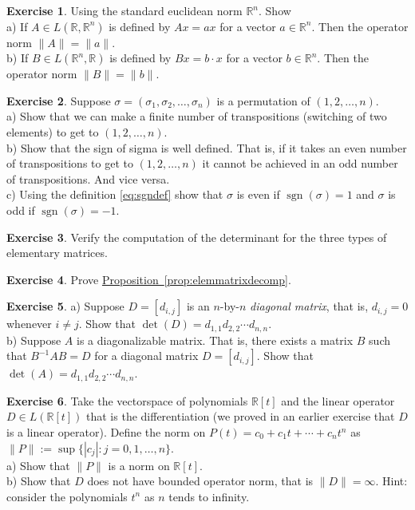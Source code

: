 \documentclass[12pt]{book}
\newcommand{\snorm}[1]{\lVert {#1} \rVert}
\newcommand{\abs}[1]{\left\lvert {#1} \right\rvert}
\newcommand{\R}{{\mathbb{R}}}
\newcommand{\myindex}[1]{#1\index{#1}}
\theoremstyle{plain}
\theoremstyle{remark}
\theoremstyle{definition}
\theoremstyle{exercise}
\newtheorem{exercise}{Exercise}[section]
\theoremstyle{example}
\newcommand{\propref}[1]{\hyperref[#1]{Proposition~\ref*{#1}}}
\begin{document}
\begin{exercise} \label{exercise:normonedim}
Using the standard euclidean norm $\R^n$. Show
\\
a) If $A \in L(\R,\R^n)$ is defined by $Ax = ax$
for a vector $a \in \R^n$.
Then the operator norm $\snorm{A} = \snorm{a}$.
\\
b) If $B \in L(\R^n,\R)$ is defined by $Bx = b \cdot x$
for a vector $b \in \R^n$.
Then the operator norm $\snorm{B} = \snorm{b}$.
\end{exercise}

\begin{exercise}
Suppose $\sigma = (\sigma_1,\sigma_2,\ldots,\sigma_n)$ is a permutation of
$(1,2,\ldots,n)$.\\
a) Show that we can make a finite number of transpositions (switching of two
elements) to get to $(1,2,\ldots,n)$.\\
b) Show that the sign of sigma is well defined.  That is, if it takes an even number
of transpositions to get to $(1,2,\ldots,n)$ it cannot be achieved in an odd
number of transpositions.  And vice versa.\\
c) Using the definition \eqref{eq:sgndef}
show that $\sigma$ is even if $\operatorname{sgn}(\sigma) = 1$ and $\sigma$
is odd if $\operatorname{sgn}(\sigma) = -1$.
\end{exercise}

\begin{exercise}
Verify the computation of the determinant for the three types of 
elementary matrices.
\end{exercise}

\begin{exercise}
Prove \propref{prop:elemmatrixdecomp}.
\end{exercise}

\begin{exercise}
a) Suppose $D = [d_{i,j}]$ is an $n$-by-$n$ \emph{\myindex{diagonal matrix}}, that is, $d_{i,j} = 0$ whenever $i
\not= j$.  Show that $\det(D) = d_{1,1}d_{2,2} \cdots d_{n,n}$.
\\
b) Suppose $A$ is a diagonalizable matrix.  That is, there exists a matrix
$B$ such that $B^{-1}AB = D$ for a diagonal matrix $D = [d_{i,j}]$.  Show
that $\det(A) = d_{1,1}d_{2,2} \cdots d_{n,n}$.
\end{exercise}

\begin{exercise}
Take the vectorspace of polynomials $\R[t]$ and the linear operator $D \in
L(\R[t])$ that is
the differentiation (we proved in an earlier exercise that $D$ is a linear
operator).  Define the norm on $P(t) = c_0 + c_1 t + \cdots + c_n
t^n$ as $\snorm{P} := \sup \{ \abs{c_j} : j = 0,1,\ldots,n \}$.\\
a) Show that $\snorm{P}$ is a norm on $\R[t]$.\\
b) Show that $D$ does not have bounded operator norm, that is $\snorm{D} =
\infty$.  Hint: consider the polynomials $t^n$ as $n$ tends to infinity.
\end{exercise}
\end{document}

